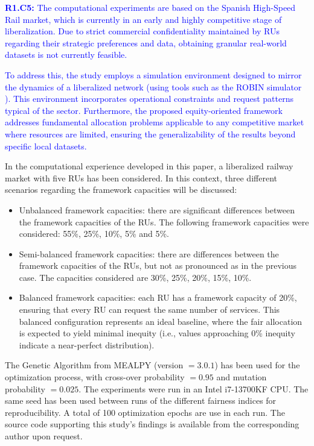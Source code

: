 \documentclass[preprint,12pt]{elsarticle}
\begin{document}
\textcolor{blue}{\textbf{R1.C5:} The computational experiments are based on the Spanish High-Speed Rail market, which is currently in an early and highly competitive stage of liberalization. Due to strict commercial confidentiality maintained by \glspl{RU} regarding their strategic preferences and data, obtaining granular real-world datasets is not currently feasible.}

\textcolor{blue}{To address this, the study employs a simulation environment designed to mirror the dynamics of a liberalized network (using tools such as the ROBIN simulator \cite{delCastillo-Herrera2024ROBIN:SimulatioNb}). This environment incorporates operational constraints and request patterns typical of the sector. Furthermore, the proposed equity-oriented framework addresses fundamental allocation problems applicable to any competitive market where resources are limited, ensuring the generalizability of the results beyond specific local datasets.}

In the computational experience developed in this paper, a liberalized railway market with five \glspl{RU} has been considered. In this context, three different scenarios regarding the framework capacities will be discussed: 

\begin{itemize}
    \item Unbalanced framework capacities: there are significant differences between the framework capacities of the RUs. The following framework capacities were considered: 55\%, 25\%, 10\%, 5\% and 5\%.
    \item Semi-balanced framework capacities: there are differences between the framework capacities of the RUs, but not as pronounced as in the previous case. The capacities considered are 30\%, 25\%, 20\%, 15\%, 10\%.
    \item Balanced framework capacities: each RU has a framework capacity of 20\%, ensuring that every RU can request the same number of services. This balanced configuration represents an ideal baseline, where the fair allocation is expected to yield minimal inequity (i.e., values approaching 0\% inequity indicate a near-perfect distribution).
\end{itemize}

The Genetic Algorithm from MEALPY (version $ =3.0.1 $) has been used for the optimization process, with cross-over probability $ = 0.95 $ and mutation probability $ = 0.025 $. The experiments were run in an Intel i7-13700KF CPU. The same seed has been used between runs of the different fairness indices for reproducibility. A total of 100 optimization epochs are use in each run. The source code supporting this study’s findings is available from the corresponding author upon request.
\end{document}
